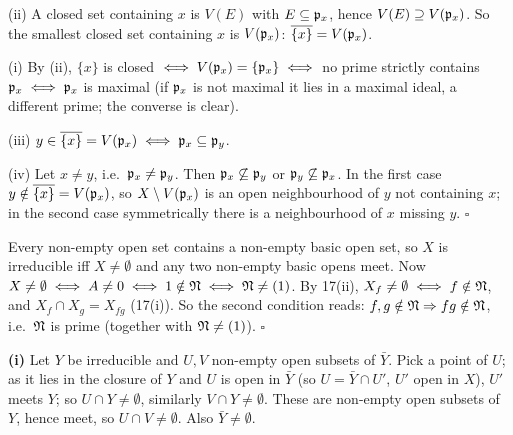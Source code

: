 \documentclass[11pt]{article}
\begin{document}
(ii) A closed set containing $x$ is $V(E)$ with $E\subseteq\mathfrak p_x$, hence $V(E)\supseteq V(\mathfrak p_x)$. So the smallest closed set containing $x$ is $V(\mathfrak p_x)$: $\overline{\{x\}}=V(\mathfrak p_x)$.

(i) By (ii), $\{x\}$ is closed $\iff V(\mathfrak p_x)=\{\mathfrak p_x\}\iff$ no prime strictly contains $\mathfrak p_x\iff\mathfrak p_x$ is maximal (if $\mathfrak p_x$ is not maximal it lies in a maximal ideal, a different prime; the converse is clear).

(iii) $y\in\overline{\{x\}}=V(\mathfrak p_x)\iff\mathfrak p_x\subseteq\mathfrak p_y$.

(iv) Let $x\neq y$, i.e.\ $\mathfrak p_x\neq\mathfrak p_y$. Then $\mathfrak p_x\not\subseteq\mathfrak p_y$ or $\mathfrak p_y\not\subseteq\mathfrak p_x$. In the first case $y\notin\overline{\{x\}}=V(\mathfrak p_x)$, so $X\setminus V(\mathfrak p_x)$ is an open neighbourhood of $y$ not containing $x$; in the second case symmetrically there is a neighbourhood of $x$ missing $y$. \hfill$\square$

\pf
Every non-empty open set contains a non-empty basic open set, so $X$ is irreducible iff $X\neq\emptyset$ and any two non-empty basic opens meet. Now $X\ne\emptyset\iff A\ne0\iff 1\notin\mathfrak N\iff\mathfrak N\ne(1)$. By 17(ii), $X_f\neq\emptyset\iff f\notin\mathfrak N$, and $X_f\cap X_g=X_{fg}$ (17(i)). So the second condition reads: $f,g\notin\mathfrak N\Rightarrow fg\notin\mathfrak N$, i.e.\ $\mathfrak N$ is prime (together with $\mathfrak N\ne(1)$). \hfill$\square$

\pf
\textbf{(i)} Let $Y$ be irreducible and $U,V$ non-empty open subsets of $\bar Y$. Pick a point of $U$; as it lies in the closure of $Y$ and $U$ is open in $\bar Y$ (so $U=\bar Y\cap U'$, $U'$ open in $X$), $U'$ meets $Y$; so $U\cap Y\ne\emptyset$, similarly $V\cap Y\ne\emptyset$. These are non-empty open subsets of $Y$, hence meet, so $U\cap V\ne\emptyset$. Also $\bar Y\ne\emptyset$.
\end{document}
